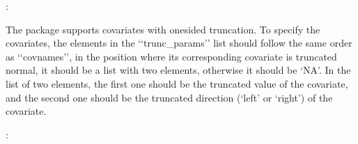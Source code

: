 \documentclass[letterpaper,10pt,english]{sphinxmanual}
\begin{document}
\sphinxAtStartPar
{}:

\begin{sphinxVerbatim}[commandchars=\\\{\}]
  \PYG{p}{[} \PYG{p}{]}
  \PYG{p}{[} \PYG{p}{]}
  \PYG{p}{[}
             \PYG{p}{]}

  \PYG{p}{[}\PYG{p}{[} \PYG{p}{]} \PYG{p}{]}

             
\end{sphinxVerbatim}

\sphinxAtStartPar
The package supports covariates with one\sphinxhyphen{}sided truncation. To specify the covariates,
the elements in the ‘‘trunc\_params’’ list should follow the same order as ‘‘covnames’’,
in the position where its corresponding covariate is truncated normal, it should be a list with two elements,
otherwise it should be ‘NA’. In the list of two elements, the first one should be the truncated value of the covariate,
and the second one should be the truncated direction (‘left’ or ‘right’) of the covariate.

\sphinxAtStartPar
{} :
\end{document}

